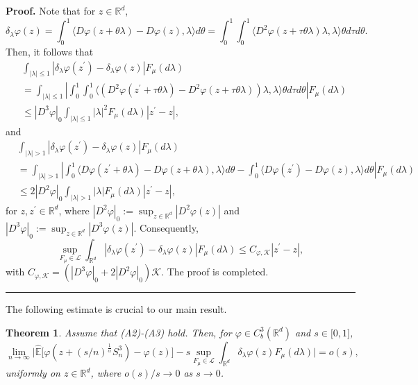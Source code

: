 \documentclass[a4paper,oneside,10pt]{article}%
\newtheorem{theorem}{Theorem}[section]
\newenvironment{proof}[1][Proof]{\noindent \textbf{#1.} }{\  \rule{0.5em}{0.5em}}
\numberwithin{equation}{section}
\begin{document}
\begin{proof}
Note that for $z\in \mathbb{R}^{d}$,
\[
\delta_{\lambda}\varphi \left(  z\right)  =\int_{0}^{1}\langle D\varphi
(z+\theta \lambda)-D\varphi(z),\lambda \rangle d\theta=\int_{0}^{1}\int_{0}%
^{1}\langle D^{2}\varphi(z+\tau \theta \lambda)\lambda,\lambda \rangle \theta
d\tau d\theta.
\]
Then, it follows that
\begin{align*}
&  \int_{|\lambda|\leq1}\left \vert \delta_{\lambda}\varphi(z^{\prime}%
)-\delta_{\lambda}\varphi \left(  z\right)  \right \vert F_{\mu}(d\lambda)\\
&  =\int_{|\lambda|\leq1}\left \vert \int_{0}^{1}\int_{0}^{1}\langle
(D^{2}\varphi(z^{\prime}+\tau \theta \lambda)-D^{2}\varphi(z+\tau \theta
\lambda))\lambda,\lambda \rangle \theta d\tau d\theta \right \vert F_{\mu
}(d\lambda)\\
&  \leq|D^{3}\varphi|_{0}\int_{|\lambda|\leq1}|\lambda|^{2}F_{\mu}%
(d\lambda)|z^{\prime}-z|,
\end{align*}
and
\begin{align*}
&  \int_{|\lambda|>1}\left \vert \delta_{\lambda}\varphi(z^{\prime}%
)-\delta_{\lambda}\varphi \left(  z\right)  \right \vert F_{\mu}(d\lambda)\\
&  =\int_{|\lambda|>1}\left \vert \int_{0}^{1}\langle D\varphi(z^{\prime
}+\theta \lambda)-D\varphi(z+\theta \lambda),\lambda \rangle d\theta-\int_{0}%
^{1}\langle D\varphi(z^{\prime})-D\varphi(z),\lambda \rangle d\theta \right \vert
F_{\mu}(d\lambda)\\
&  \leq2\left \vert D^{2}\varphi \right \vert _{0}\int_{|\lambda|>1}%
|\lambda|F_{\mu}(d\lambda)|z^{\prime}-z|,
\end{align*}
for $z,z^{\prime}\in \mathbb{R}^{d}$, where $|D^{2}\varphi|_{0}:=\sup
_{z\in \mathbb{R}^{d}}|D^{2}\varphi(z)|$ and $|D^{3}\varphi|_{0}:=\sup
_{z\in \mathbb{R}^{d}}|D^{3}\varphi(z)|$. Consequently,
\[
\sup \limits_{F_{\mu}\in \mathcal{L}}\int_{\mathbb{R}^{d}}\left \vert
\delta_{\lambda}\varphi(z^{\prime})-\delta_{\lambda}\varphi \left(  z\right)
\right \vert F_{\mu}(d\lambda)\leq C_{\varphi,\mathcal{K}}|z^{\prime}-z|,
\]
with $C_{\varphi,\mathcal{K}}=(|D^{3}\varphi|_{0}+2\left \vert D^{2}%
\varphi \right \vert _{0})\mathcal{K}$. The proof is completed.
\end{proof}

The following estimate is crucial to our main result.

\begin{theorem}
\label{recursive}Assume that (A2)-(A3) hold. Then, for $\varphi \in C_{b}%
^{3}(\mathbb{R}^{d})$ and $s\in \lbrack0,1]$,
\begin{equation}
\lim_{n\rightarrow \infty}\bigg \vert \mathbb{\hat{E}}\bigg[\varphi \left(
z+(s/n)^{\frac{1}{\alpha}}S_{n}^{3}\right)  -\varphi(z)\bigg]-s\sup
\limits_{F_{\mu}\in \mathcal{L}}\int_{\mathbb{R}^{d}}\delta_{\lambda}
\varphi(z)F_{\mu}(d\lambda)\bigg \vert=o(s),\nonumber
\end{equation}
uniformly on $z\in \mathbb{R}^{d}$, where $o(s)/s\rightarrow0$ as
$s\rightarrow0$.
\end{theorem}
\end{document}

